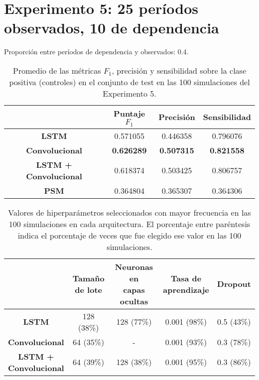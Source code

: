 \documentclass[../../main.tex]{subfiles}
\begin{document}
\section{Experimento 5: 25 períodos observados, 10 de dependencia}
Proporción entre períodos de dependencia y observados: 0.4.

\begin{table}[H]
    \centering
    \renewcommand{\arraystretch}{1.2}
    \begin{tabular}{|c|c|c|c|}
        \hline
         & \textbf{Puntaje} \(F_1\) & \textbf{Precisión} & \textbf{Sensibilidad} \\ \hline\hline
        \textbf{LSTM}
            & 0.571055 & 0.446358 & 0.796076 \\ \hline
        \textbf{Convolucional}
            & \textbf{0.626289} & \textbf{0.507315} & \textbf{0.821558} \\ \hline
        \textbf{LSTM + Convolucional}
            & 0.618374 & 0.503425 & 0.806757 \\ \hline
        \textbf{PSM}
            & 0.364804 & 0.365307 & 0.364306 \\
        \hline
    \end{tabular}
    \caption{Promedio de las métricas \(F_1\), precisión y sensibilidad sobre la
    clase positiva (controles) en el conjunto de test en las 100 simulaciones del
    Experimento 5.}
    \label{tab:results_exp5}
\end{table}

\begin{table}[H]
    \centering
    \renewcommand{\arraystretch}{1.2}
    \begin{tabular}{|c|c|c|c|c|}
        \hline
            & \makecell{\textbf{Tamaño}\\\textbf{de lote}}
            & \makecell{\textbf{Neuronas en}\\\textbf{capas ocultas}}
            & \makecell{\textbf{Tasa de}\\\textbf{aprendizaje}}
            & \textbf{Dropout} \\ \hline\hline
        \textbf{LSTM}
            & 128 (38\%) & 128 (77\%) & 0.001 (98\%) & 0.5 (43\%) \\ \hline
        \textbf{Convolucional}
            & 64 (35\%) & -           & 0.001 (93\%) & 0.3 (78\%) \\ \hline
        \makecell{\textbf{LSTM +}\\\textbf{Convolucional}}
            & 64 (39\%) & 128 (38\%)  & 0.001 (95\%) & 0.3 (86\%) \\
        \hline
    \end{tabular}
    \caption{Valores de hiperparámetros seleccionados con mayor frecuencia en las 100
    simulaciones en cada arquitectura. El porcentaje entre paréntesis indica el porcentaje
    de veces que fue elegido ese valor en las 100 simulaciones.}
    \label{tab:hyperparams_exp5}
\end{table}
\end{document}
